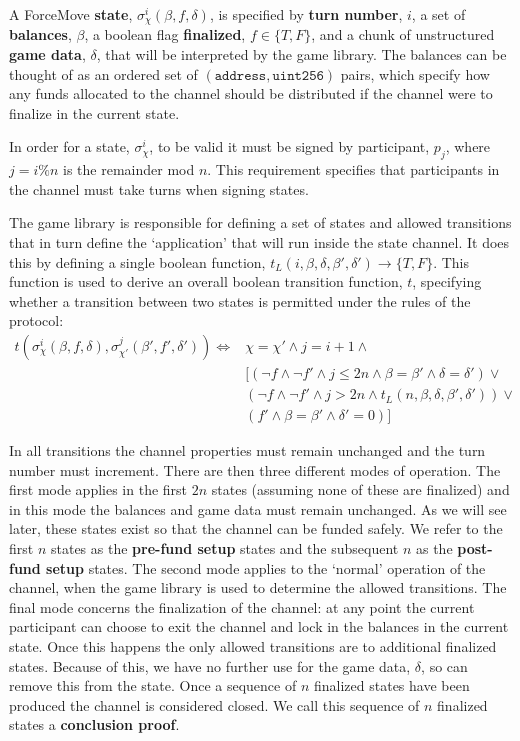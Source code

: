 A ForceMove \textbf{state}, $\sigma_\chi^i(\beta, f, \delta)$, is specified by \textbf{turn number}, $i$,
a set of \textbf{balances}, $\beta$, a boolean flag \textbf{finalized}, $f \in \{T, F\}$, and
a chunk of unstructured \textbf{game data}, $\delta$, that will be interpreted by the game library. The
balances can be thought of as an ordered set of $(\texttt{address}, \texttt{uint256})$ pairs,
which specify how any funds allocated to the channel should be distributed if the channel 
were to finalize in the current state.

In order for a state, $\sigma_\chi^i$, to be valid it must be signed by participant, $p_j$,
where $j = i \% n$ is the remainder mod $n$. This requirement specifies that participants
in the channel must take turns when signing states.

The game library is responsible for defining a set of states and allowed transitions that
in turn define the `application' that will run inside the state channel. It does this by
defining a single boolean function, $t_L(i, \beta, \delta, \beta', \delta') \rightarrow \{ T, F\}$.
This function is used to derive an overall boolean transition function, $t$, specifying whether
a transition between two states is permitted under the rules of the protocol:
\begin{align*}
  t(\sigma_\chi^i(\beta, f, \delta), \sigma_{\chi'}^j(\beta', f', \delta') ) \Leftrightarrow &
    \chi = \chi'
    \wedge j = i + 1
    \wedge \\
    & [ (\neg f \wedge \neg f' \wedge j \leq 2n \wedge \beta = \beta' \wedge \delta = \delta') \vee \\
    & (\neg f \wedge \neg f' \wedge j > 2n \wedge t_L(n, \beta, \delta, \beta', \delta')) \vee \\
    & (f' \wedge \beta = \beta' \wedge \delta' = 0) ]
\end{align*}

In all transitions the channel properties must remain unchanged and the turn number must increment.
There are then three different modes of operation. The first mode applies in the first $2n$
states (assuming none of these are finalized) and in this mode the balances and game data
must remain unchanged. As we will see later, these states exist so that the channel can be
funded safely. We refer to the first $n$ states as the \textbf{pre-fund setup} states and
the subsequent $n$ as the \textbf{post-fund setup} states. The second mode applies to the
`normal' operation of the channel, when the game library is used to determine the allowed
transitions. The final mode concerns the finalization of the channel: at any point the current
participant can choose to exit the channel and lock in the balances in the current state.
Once this happens the only allowed transitions are to additional finalized states. Because
of this, we have no further use for the game data, $\delta$, so can remove this from the state.
Once a sequence of $n$ finalized states have been produced the channel is considered closed. We
call this sequence of $n$ finalized states a \textbf{conclusion proof}.



